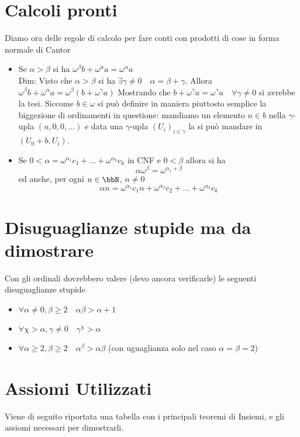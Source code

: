\documentclass[a4paper,NoNotes,GeneralMath]{stdmdoc}
\begin{document}
	\section*{Calcoli pronti}
	Diamo ora delle regole di calcolo per fare conti con prodotti di cose in forma normale di Cantor
	\begin{itemize}
		\item Se $\alpha > \beta$ si ha $\omega^\beta b + \omega^\alpha a = \omega^\alpha a$ \\
			Dim: Visto che $\alpha > \beta$ si ha $\exists \gamma \neq 0 \quad \alpha = \beta + \gamma$. Allora $\omega^\beta b + \omega^\alpha a = \omega^\beta (b + \omega^\gamma a)$ Mostrando che $b + \omega^\gamma a = \omega^\gamma a \quad \forall \gamma \neq 0$ si avrebbe la tesi. Siccome $b \in \omega$ si può definire in maniera piuttosto semplice la biggezione di ordinamenti in questione: mandiamo un elemento $n \in b$ nella $\gamma$-upla $(n, 0, 0, \ldots)$ e data una $\gamma$-upla $(U_i)_{i \in \gamma}$ la si può mandare in $(U_0 + b, U_i)$.
		\item Se $0 < \alpha = \omega^{\alpha_1} c_1 + \ldots + \omega^{\alpha_k} c_k$ in CNF e $0 < \beta$ allora si ha
			$$ \alpha \omega^\beta = \omega^{\alpha_1 + \beta} $$ ed anche, per ogni $n \in \bbN$, $n \neq 0$
			$$ \alpha n = \omega^{\alpha_1} c_1 n + \omega^{\alpha_2} c_2 + \ldots + \omega^{\alpha_k} c_k $$
	\end{itemize}
	
	\section*{Disuguaglianze stupide ma da dimostrare}
	Con gli ordinali dovrebbero valere (devo ancora verificarle) le seguenti disuguaglianze stupide
	\begin{itemize}
		\item $\forall \alpha \neq 0, \beta \ge 2 \quad \alpha \beta > \alpha + 1$
		\item $\forall \chi > \alpha, \gamma \neq 0 \quad \gamma^\chi > \alpha$
		\item $\forall \alpha \ge 2, \beta \ge 2 \quad \alpha^\beta > \alpha \beta$ (con uguaglianza solo nel caso $\alpha = \beta = 2$)
	\end{itemize}
	
	\section*{Assiomi Utilizzati}
	Viene di seguito riportata una tabella con i principali teoremi di Insiemi, e gli assiomi necessari per dimostrarli.
	
	
\end{document}
